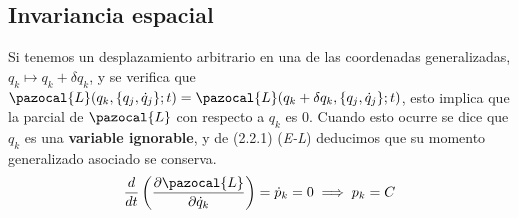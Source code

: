 \vspace{-25pt}
\subsection{Invariancia espacial}
Si tenemos un desplazamiento arbitrario en una de las coordenadas generalizadas, $q_k\mapsto q_k + \delta q_k$, y se verifica que $\pazocal{L}(q_k,\{q_j,\dot{q}_j\};t)=\pazocal{L}(q_k+\delta q_k,\{q_j,\dot{q}_j\};t)$, esto implica que la parcial de $\pazocal{L}$ con respecto a $q_k$ es 0. Cuando esto ocurre se dice que $q_k$ es una \textbf{variable ignorable}, y de (2.2.1)  (\textit{E-L}) deducimos que su momento generalizado asociado se conserva.
\begin{equation} \label{3.2.1}
    \frac{d}{dt}\left(\frac{\partial \pazocal{L}}{\partial \dot{q}_k}\right) = \dot{p}_k = 0 \implies p_k = C
\end{equation} 
